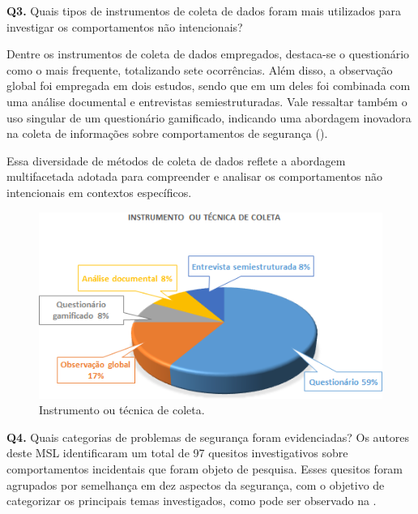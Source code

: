 \documentclass[portuguese]{textolivre}
\begin{document}
\textbf{Q3.} Quais tipos de instrumentos de coleta de dados foram mais utilizados para investigar os comportamentos não intencionais?

Dentre os instrumentos de coleta de dados empregados, destaca-se o questionário como o mais frequente, totalizando sete ocorrências. Além disso, a observação global foi empregada em dois estudos, sendo que em um deles foi combinada com uma análise documental e entrevistas semiestruturadas. Vale ressaltar também o uso singular de um questionário gamificado, indicando uma abordagem inovadora na coleta de informações sobre comportamentos de segurança ().

Essa diversidade de métodos de coleta de dados reflete a abordagem multifacetada adotada para compreender e analisar os comportamentos não intencionais em contextos específicos.

\begin{figure}[htbp]
\centering
\begin{minipage}{0.85\linewidth}
  \includegraphics[width=\linewidth]{Fig5.png}
  \caption{Instrumento ou técnica de coleta.}
  \label{fig5}
\end{minipage}
\end{figure}

\textbf{Q4.} Quais categorias de problemas de segurança foram evidenciadas?
Os autores deste MSL identificaram um total de 97 quesitos investigativos sobre comportamentos incidentais que foram objeto de pesquisa. Esses quesitos foram agrupados por semelhança em dez aspectos da segurança, com o objetivo de categorizar os principais temas investigados, como pode ser observado na .
\end{document}
